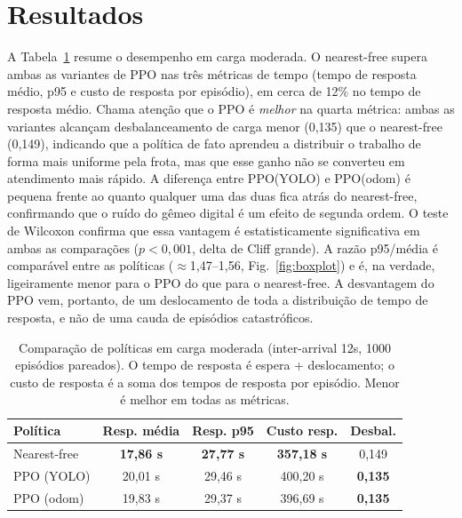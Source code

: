\documentclass[conference]{IEEEtran}
\begin{document}
\section{Resultados}

A Tabela~\ref{tab:ablation} resume o desempenho em carga moderada. O nearest-free supera ambas as variantes de PPO nas três métricas de tempo (tempo de resposta médio, p95 e custo de resposta por episódio), em cerca de 12\% no tempo de resposta médio. Chama atenção que o PPO é \emph{melhor} na quarta métrica: ambas as variantes alcançam desbalanceamento de carga menor (0,135) que o nearest-free (0,149), indicando que a política de fato aprendeu a distribuir o trabalho de forma mais uniforme pela frota, mas que esse ganho não se converteu em atendimento mais rápido. A diferença entre PPO(YOLO) e PPO(odom) é pequena frente ao quanto qualquer uma das duas fica atrás do nearest-free, confirmando que o ruído do gêmeo digital é um efeito de segunda ordem. O teste de Wilcoxon confirma que essa vantagem é estatisticamente significativa em ambas as comparações ($p<0,001$, delta de Cliff grande). A razão p95/média é comparável entre as políticas ($\approx$1,47--1,56, Fig.~\ref{fig:boxplot}) e é, na verdade, ligeiramente menor para o PPO do que para o nearest-free. A desvantagem do PPO vem, portanto, de um deslocamento de toda a distribuição de tempo de resposta, e não de uma cauda de episódios catastróficos.

\begin{table}[htbp]
\caption{Comparação de políticas em carga moderada (inter-arrival 12s, 1000 episódios pareados). O tempo de resposta é espera + deslocamento; o custo de resposta é a soma dos tempos de resposta por episódio. Menor é melhor em todas as métricas.}
\begin{center}
\begin{tabular}{|l|c|c|c|c|}
\hline
\textbf{Política} & \textbf{Resp. média} & \textbf{Resp. p95} & \textbf{Custo resp.} & \textbf{Desbal.} \\
\hline
Nearest-free & \textbf{17,86 s} & \textbf{27,77 s} & \textbf{357,18 s} & 0,149 \\
\hline
PPO (YOLO) & 20,01 s & 29,46 s & 400,20 s & \textbf{0,135} \\
\hline
PPO (odom) & 19,83 s & 29,37 s & 396,69 s & \textbf{0,135} \\
\hline
\end{tabular}
\label{tab:ablation}
\end{center}
\end{table}
\end{document}
